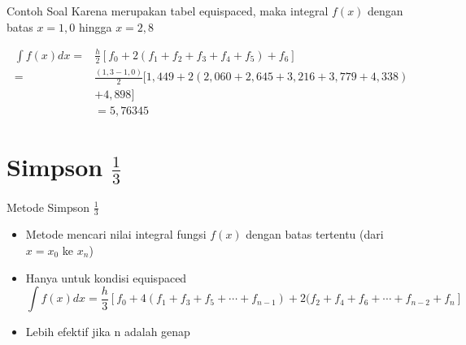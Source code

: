 \documentclass[10pt]{beamer}
\begin{document}
\begin{frame}[fragile]{Contoh Soal}
    Karena merupakan tabel \alert{equispaced}, maka integral $f(x)$ dengan batas $x = 1,0$ hingga $x = 2,8$
    
    \begin{align*}
        \int f(x) dx =& \frac{h}{2}[f_0 + 2(f_1 + f_2 + f_3 + f_4 + f_5) + f_6]\\
        {} =& \frac{(1,3 - 1,0)}{2}[1,449 + 2(2,060 + 2,645 + 3,216 + 3,779 + 4,338)\\
        &+ 4,898] \\
        {} &= 5,76345
    \end{align*}
\end{frame}

\section{Simpson $\frac{1}{3}$}

\begin{frame}[fragile]{Metode Simpson $\frac{1}{3}$}
    \begin{itemize}[<+- | alert@+>]
        \item Metode mencari nilai integral fungsi $f(x)$ dengan batas tertentu (dari $x = x_0$ ke $x_n$)
        \item Hanya untuk kondisi equispaced
        $$\int f(x) dx = \frac{h}{3}[f_0 + 4(f_1 + f_3 + f_5 + \cdots + f_{n-1}) + 2(f_2 + f_4 + f_6 + \cdots + f_{n-2} + f_n]$$
        \item Lebih efektif jika n adalah genap
    \end{itemize}
\end{frame}
\end{document}
